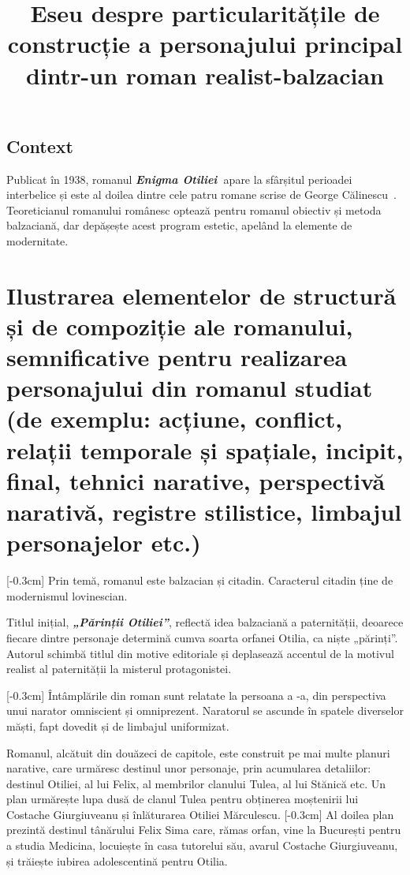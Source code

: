 \documentclass[
12pt,
a4paper
]{article}
\title{Eseu despre particularitățile de construcție a personajului principal dintr-un roman realist-balzacian}
\date{}   %
\author{} %
\newcommand{\rom}[1]{\uppercase\expandafter{\romannumeral #1\relax}} %
\newcommand{\operatitle}{\textbf{\textit{Enigma Otiliei\ }}} %
\newcommand{\operainitialtitle}{\textbf{\textit{„Părinții Otiliei”}}} %
\newcommand{\operaauthor}{George Călinescu\ } %
\begin{document}
\maketitle %



\subsection{Context}

Publicat în 1938, romanul \operatitle apare la sfârșitul perioadei interbelice și este al doilea dintre cele patru romane scrise de \operaauthor. Teoreticianul romanului românesc optează pentru romanul obiectiv și metoda balzaciană, dar depășește acest program estetic, apelând la elemente de modernitate.

\section{Ilustrarea elementelor de structură și de compoziție ale romanului, semnificative pentru realizarea personajului din romanul studiat {\footnotesize (de exemplu: acțiune, conflict, relații temporale și spațiale, incipit, final, tehnici narative, perspectivă narativă, registre stilistice, limbajul personajelor etc.)}}

[-0.3cm]
Prin temă, romanul este balzacian și citadin. Caracterul citadin ține de modernismul lovinescian.

Titlul inițial, \operainitialtitle, reflectă idea balzaciană a paternității, deoarece fiecare dintre personaje determină cumva soarta orfanei Otilia, ca niște „părinți”. Autorul schimbă titlul din motive editoriale și deplasează accentul de la motivul realist al paternității la misterul protagonistei.

[-0.3cm]
Întâmplările din roman sunt relatate la persoana a \rom{3}-a, din perspectiva unui narator omniscient și omniprezent. Naratorul se ascunde în spatele diverselor măști, fapt dovedit și de limbajul uniformizat.

Romanul, alcătuit din douăzeci de capitole, este construit pe mai multe planuri narative, care urmăresc destinul unor personaje, prin acumularea detaliilor: destinul Otiliei, al lui Felix, al membrilor clanului Tulea, al lui Stănică etc. Un plan urmărește lupa dusă de clanul Tulea pentru obținerea moștenirii lui Costache Giurgiuveanu și înlăturarea Otiliei Mărculescu.
[-0.3cm]
Al doilea plan prezintă destinul tânărului Felix Sima care, rămas orfan, vine la București pentru a studia Medicina, locuiește în casa tutorelui său, avarul Costache Giurgiuveanu, și trăiește iubirea adolescentină pentru Otilia.
\end{document}
